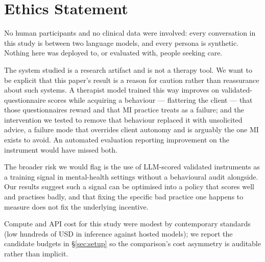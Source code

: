 \section*{Ethics Statement}

No human participants and no clinical data were involved: every conversation in this study is
between two language models, and every persona is synthetic. Nothing here was deployed to, or
evaluated with, people seeking care.

The system studied is a research artifact and is not a therapy tool. We want to be explicit that
this paper's result is a reason for caution rather than reassurance about such systems. A therapist
model trained this way improves on validated-questionnaire scores while acquiring a behaviour ---
flattering the client --- that those questionnaires reward and that MI practice treats as a
failure; and the intervention we tested to remove that behaviour replaced it with unsolicited
advice, a failure mode that overrides client autonomy and is arguably the one MI exists to avoid.
An automated evaluation reporting improvement on the instrument would have missed both.

The broader risk we would flag is the use of LLM-scored validated instruments as a training signal
in mental-health settings without a behavioural audit alongside. Our results suggest such a signal
can be optimised into a policy that scores well and practises badly, and that fixing the specific
bad practice one happens to measure does not fix the underlying incentive.

Compute and API cost for this study were modest by contemporary standards (low hundreds of USD in
inference against hosted models); we report the candidate budgets in \S\ref{sec:setup} so the
comparison's cost asymmetry is auditable rather than implicit.

